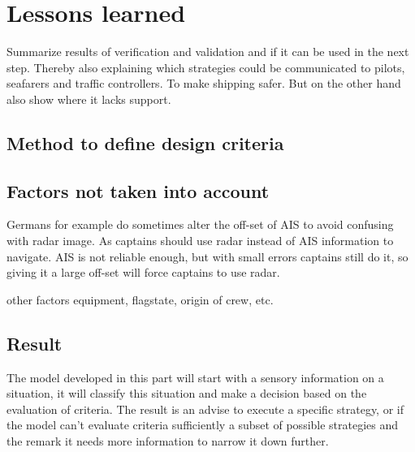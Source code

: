 \chapter{Lessons learned}
Summarize results of verification and validation and if it can be used in the next step. Thereby also explaining which strategies could be communicated to pilots, seafarers and traffic controllers. To make shipping safer. But on the other hand also show where it lacks support.

\section{Method to define design criteria}

\section{Factors not taken into account}
Germans for example do sometimes alter the off-set of AIS to avoid confusing with radar image. As captains should use radar instead of AIS information to navigate. AIS is not reliable enough, but with small errors captains still do it, so giving it a large off-set will force captains to use radar.

other factors equipment, flagstate, origin of crew, etc.

\section{Result}
The model developed in this part will start with a sensory information on a situation, it will classify this situation and make a decision based on the evaluation of criteria. The result is an advise to execute a specific strategy, or if the model can't evaluate criteria sufficiently a subset of possible strategies and the remark it needs more information to narrow it down further.